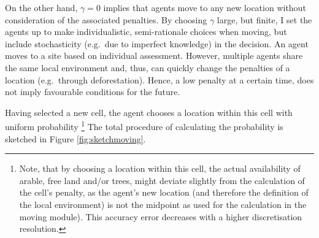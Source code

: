On the other hand, $\gamma=0$ implies that agents move to any new location without consideration of the associated penalties.
By choosing $\gamma$ large, but finite, I set the agents up to make individualistic, semi-rationale choices when moving, but include stochasticity (e.g.\ due to imperfect knowledge) in the decision.
An agent moves to a site based on individual assessment.
However, multiple agents share the same local environment and, thus, can quickly change the penalties of a location (e.g.\ through deforestation). 
Hence, a low penalty at a certain time, does not imply favourable conditions for the future.

Having selected a new cell, the agent chooses a location within this cell with uniform probability
\footnote{Note, that by choosing a location within this cell, the actual availability of arable, free land and/or trees, might deviate slightly from the calculation of the cell's penalty, as the agent's new location (and therefore the definition of the local environment) is not the midpoint as used for the calculation in the moving module).
This accuracy error decreases with a higher discretisation resolution.}
The total procedure of calculating the probability is sketched in Figure \ref{fig:sketchmoving}.

